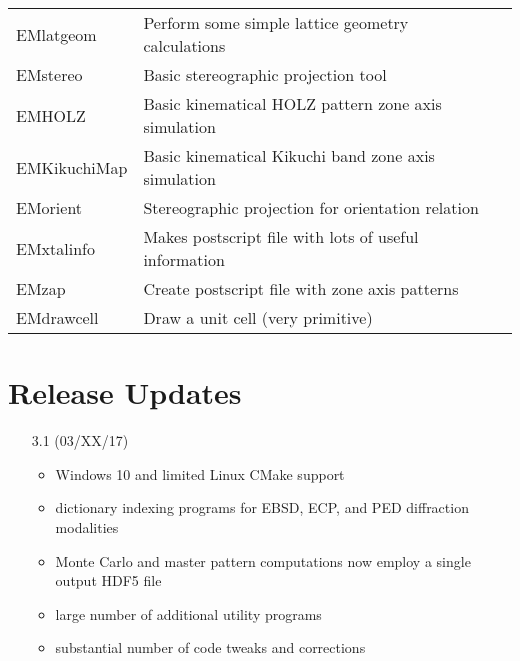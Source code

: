 \documentclass[DIV=calc, paper=letter, fontsize=11pt]{scrartcl}	 %
\begin{document}
\begin{table*}[h]
{\begin{tabular}{|l|l|c|}
  \textsf{EMlatgeom} & Perform some simple lattice geometry calculations & \\
  \textsf{EMstereo} & Basic stereographic projection tool & \\
  {\color{blue}\textsf{EMHOLZ}} & Basic kinematical HOLZ pattern zone axis simulation & \\
  {\color{blue}\textsf{EMKikuchiMap}} & Basic kinematical Kikuchi band zone axis simulation & \\
  \textsf{EMorient} & Stereographic projection for orientation relation & \\
  \textsf{EMxtalinfo} & Makes postscript file with lots of useful information & \\
  \textsf{EMzap} & Create postscript file with zone axis patterns & \\
  \textsf{EMdrawcell} & Draw a unit cell (very primitive) & \\
\hline
\end{tabular}}
\end{table*}

\clearpage
\section{Release Updates}
\begin{itemize}
	\item [3.1] (03/XX/17) \begin{itemize}
		\item Windows 10 and limited Linux CMake support
		\item dictionary indexing programs for EBSD, ECP, and PED diffraction modalities
		\item Monte Carlo and master pattern computations now employ a single output HDF5 file
		\item large number of additional utility programs
		\item substantial number of code tweaks and corrections
	\end{itemize}
\end{itemize}
\end{document}
